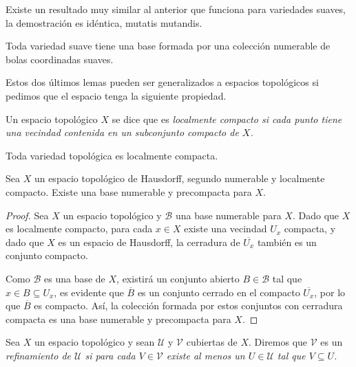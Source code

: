 Existe un resultado muy similar al anterior que funciona para variedades suaves, la demostración es idéntica, mutatis mutandis.

\begin{lemma}\label{Lemma: Base Por Bolas Suaves}
  Toda variedad suave tiene una base formada por una colección numerable de bolas coordinadas suaves.
\end{lemma}

Estos dos últimos lemas pueden ser generalizados a espacios topológicos si pedimos que el espacio tenga la siguiente propiedad.

\begin{definition}
  Un espacio topológico $X$ se dice que es \it{localmente compacto} si cada punto tiene una vecindad contenida en un subconjunto compacto de $X$.
\end{definition}

\begin{corollary}
  Toda variedad topológica es localmente compacta.
\end{corollary}

\begin{lemma}
  Sea $X$ un espacio topológico de Hausdorff, segundo numerable y localmente compacto. Existe una base numerable y precompacta para $X$.
\end{lemma}

\begin{proof}
  Sea $X$ un espacio topológico y $\mathcal{B}$ una base numerable para $X$. Dado que $X$ es localmente compacto, para cada $x \in X$ existe una vecindad $U_x$ compacta, y dado que $X$ es un espacio de Hausdorff, la cerradura de $\overline{U_x}$ también es un conjunto compacto.

  Como $\mathcal{B}$ es una base de $X$, existirá un conjunto abierto $B \in \mathcal{B}$ tal que $x \in B \subseteq U_x$, es evidente que $\overline{B}$ es un conjunto cerrado en el compacto $\overline{U_x}$, por lo que $\overline{B}$ es compacto. Así, la colección formada por estos conjuntos con cerradura compacta es una base numerable y precompacta para $X$.
\end{proof}


\begin{definition}[Refinamiento]\label{Definición: Refinamiento}
  Sea $X$ un espacio topológico y sean $\mathcal{U}$ y $\mathcal{V}$ cubiertas de $X$. Diremos que $\mathcal{V}$ es un \it{refinamiento de $\mathcal{U}$} si para cada $V \in \mathcal{V}$ existe al menos un $U \in \mathcal{U}$ tal que $V \subseteq U$.
\end{definition}

